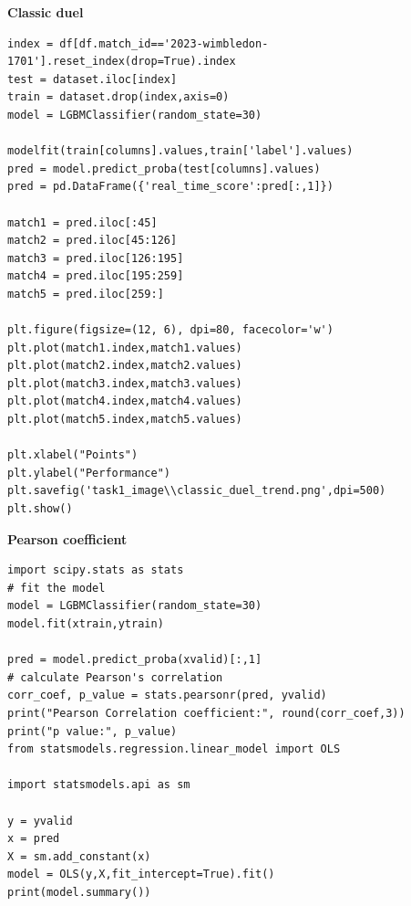 \documentclass[12pt]{article}
\begin{document}
\textbf{Classic duel}
\begin{lstlisting}[caption={Classic duel}, label=python-example]
index = df[df.match_id=='2023-wimbledon-1701'].reset_index(drop=True).index
test = dataset.iloc[index]
train = dataset.drop(index,axis=0)
model = LGBMClassifier(random_state=30)

modelfit(train[columns].values,train['label'].values)
pred = model.predict_proba(test[columns].values)
pred = pd.DataFrame({'real_time_score':pred[:,1]})

match1 = pred.iloc[:45]
match2 = pred.iloc[45:126]
match3 = pred.iloc[126:195]
match4 = pred.iloc[195:259]
match5 = pred.iloc[259:]

plt.figure(figsize=(12, 6), dpi=80, facecolor='w')
plt.plot(match1.index,match1.values)
plt.plot(match2.index,match2.values)
plt.plot(match3.index,match3.values)
plt.plot(match4.index,match4.values)
plt.plot(match5.index,match5.values)

plt.xlabel("Points")
plt.ylabel("Performance")
plt.savefig('task1_image\\classic_duel_trend.png',dpi=500)
plt.show()
\end{lstlisting}

\textbf{Pearson coefficient}
\begin{lstlisting}[caption={Pearson coefficient}, label=python-example]
import scipy.stats as stats
# fit the model
model = LGBMClassifier(random_state=30)
model.fit(xtrain,ytrain)
 
pred = model.predict_proba(xvalid)[:,1]
# calculate Pearson's correlation
corr_coef, p_value = stats.pearsonr(pred, yvalid)
print("Pearson Correlation coefficient:", round(corr_coef,3))
print("p value:", p_value)
from statsmodels.regression.linear_model import OLS

import statsmodels.api as sm

y = yvalid
x = pred
X = sm.add_constant(x)
model = OLS(y,X,fit_intercept=True).fit()
print(model.summary())
\end{lstlisting}
\end{document}
